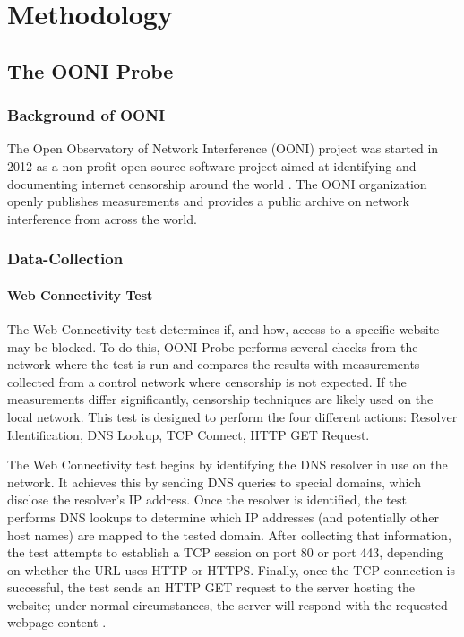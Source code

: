\chapter{Methodology}

\section{The OONI Probe}

\subsection{Background of OONI}

The Open Observatory of Network Interference (OONI) project was started in 2012 as a non-profit open-source software project aimed at identifying and documenting internet censorship around the world \cite{ooniAbout}. The OONI organization openly publishes measurements and provides a public archive on network interference from across the world. 

\subsection{Data-Collection}

\subsubsection{Web Connectivity Test}

The Web Connectivity test determines if, and how, access to a specific website may be blocked. To do this, OONI Probe performs several checks from the network where the test is run and compares the results with measurements collected from a control network where censorship is not expected. If the measurements differ significantly, censorship techniques are likely used on the local network. This test is designed to perform the four different actions: Resolver Identification, DNS Lookup, TCP Connect, HTTP GET Request.

The Web Connectivity test begins by identifying the DNS resolver in use on the network. It achieves this by sending DNS queries to special domains, which disclose the resolver’s IP address. Once the resolver is identified, the test performs DNS lookups to determine which IP addresses (and potentially other host names) are mapped to the tested domain. After collecting that information, the test attempts to establish a TCP session on port 80 or port 443, depending on whether the URL uses HTTP or HTTPS. Finally, once the TCP connection is successful, the test sends an HTTP GET request to the server hosting the website; under normal circumstances, the server will respond with the requested webpage content \cite{ooniConnectivityTest}.


